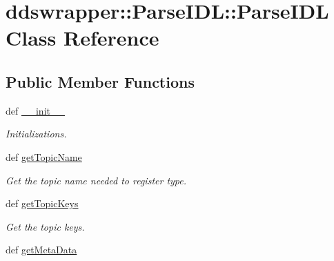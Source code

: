 \hypertarget{classddswrapper_1_1_parse_i_d_l_1_1_parse_i_d_l}{
\section{ddswrapper::ParseIDL::ParseIDL Class Reference}
\label{classddswrapper_1_1_parse_i_d_l_1_1_parse_i_d_l}
}
\subsection*{Public Member Functions}
\begin{DoxyCompactItemize}
\item 
\hypertarget{classddswrapper_1_1_parse_i_d_l_1_1_parse_i_d_l_aa40e662db43c2242ad4cd0149c8a37b5}{
def \hyperlink{classddswrapper_1_1_parse_i_d_l_1_1_parse_i_d_l_aa40e662db43c2242ad4cd0149c8a37b5}{\_\-\_\-init\_\-\_\-}}
\label{classddswrapper_1_1_parse_i_d_l_1_1_parse_i_d_l_aa40e662db43c2242ad4cd0149c8a37b5}

\begin{DoxyCompactList}\small\item\em Initializations. \end{DoxyCompactList}\item 
\hypertarget{classddswrapper_1_1_parse_i_d_l_1_1_parse_i_d_l_a6d91b4ed7e7e0f5865e63a21c7775576}{
def \hyperlink{classddswrapper_1_1_parse_i_d_l_1_1_parse_i_d_l_a6d91b4ed7e7e0f5865e63a21c7775576}{getTopicName}}
\label{classddswrapper_1_1_parse_i_d_l_1_1_parse_i_d_l_a6d91b4ed7e7e0f5865e63a21c7775576}

\begin{DoxyCompactList}\small\item\em Get the topic name needed to register type. \end{DoxyCompactList}\item 
\hypertarget{classddswrapper_1_1_parse_i_d_l_1_1_parse_i_d_l_a0b32ce84713ec90609f395e50f7aed6f}{
def \hyperlink{classddswrapper_1_1_parse_i_d_l_1_1_parse_i_d_l_a0b32ce84713ec90609f395e50f7aed6f}{getTopicKeys}}
\label{classddswrapper_1_1_parse_i_d_l_1_1_parse_i_d_l_a0b32ce84713ec90609f395e50f7aed6f}

\begin{DoxyCompactList}\small\item\em Get the topic keys. \end{DoxyCompactList}\item 
\hypertarget{classddswrapper_1_1_parse_i_d_l_1_1_parse_i_d_l_afdb5e56728b17578d648b0504ccf8ca7}{
def \hyperlink{classddswrapper_1_1_parse_i_d_l_1_1_parse_i_d_l_afdb5e56728b17578d648b0504ccf8ca7}{getMetaData}}
\label{classddswrapper_1_1_parse_i_d_l_1_1_parse_i_d_l_afdb5e56728b17578d648b0504ccf8ca7}


\end{DoxyCompactItemize}
